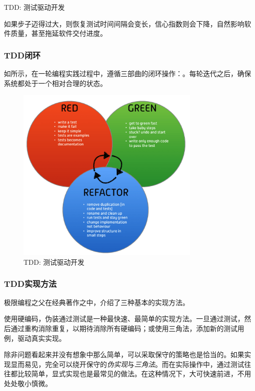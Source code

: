 \begin{content}
\begin{episode}{TDD: 测试驱动开发}
\begin{content}
如果步子迈得过大，则恢复测试时间间隔会变长，信心指数则会下降，自然影响软件质量，甚至拖延软件交付进度。

\subsubsection{TDD闭环}

如所示，在一轮编程实践过程中，遵循三部曲的闭环操作：。每轮迭代之后，确保系统都处于一个相对合理的状态。

\begin{figure}[H]
\centering
\includegraphics[width=0.8\textwidth]{figures/xunit/tdd-cycle.png}
\caption{TDD: 测试驱动开发}
 \label{fig:tdd-cycle}
\end{figure}

\subsubsection{TDD实现方法}

极限编程之父在经典著作之中，介绍了三种基本的实现方法。

\begin{enum}
\end{enum}

使用硬编码，伪装通过测试是一种最快速、最简单的实现方法。一旦通过测试，然后通过重构消除重复，以期待消除所有硬编码；或使用三角法，添加新的测试用例，驱动真实实现。

除非问题看起来并没有想象中那么简单，可以采取保守的策略也是恰当的。如果实现显而易见，完全可以绕开保守的\emph{伪实现}与\emph{三角法}。而在实际操作中，通过测试往往都比较简单，显式实现也是最常见的做法。在这种情况下，大可快速前进，不用处处敬小慎微。


\end{content}
\end{episode}
\end{content}
